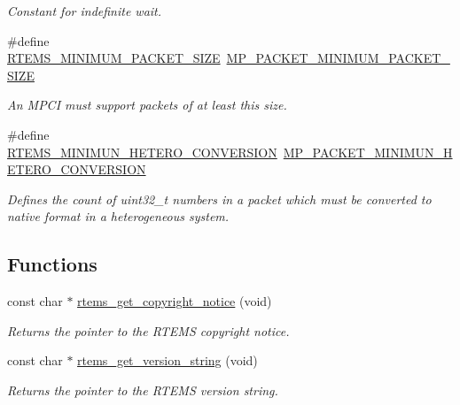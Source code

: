 \begin{DoxyCompactItemize}
\begin{DoxyCompactList}\small\item\em Constant for indefinite wait. \end{DoxyCompactList}\item 
\mbox{\label{group__RTEMSAPIClassic_ga29a700d690aee95d785836f54ff4550a}} 
\#define \mbox{\hyperlink{group__RTEMSAPIClassic_ga29a700d690aee95d785836f54ff4550a}{R\+T\+E\+M\+S\+\_\+\+M\+I\+N\+I\+M\+U\+M\+\_\+\+P\+A\+C\+K\+E\+T\+\_\+\+S\+I\+ZE}}~\mbox{\hyperlink{group__RTEMSScoreMPPacket_gadb26ef7629e08a46b4d1caa3a61a6788}{M\+P\+\_\+\+P\+A\+C\+K\+E\+T\+\_\+\+M\+I\+N\+I\+M\+U\+M\+\_\+\+P\+A\+C\+K\+E\+T\+\_\+\+S\+I\+ZE}}
\begin{DoxyCompactList}\small\item\em An M\+P\+CI must support packets of at least this size. \end{DoxyCompactList}\item 
\#define \mbox{\hyperlink{group__RTEMSAPIClassic_ga9c3131af02cd6bf59c91d77b23e0e418}{R\+T\+E\+M\+S\+\_\+\+M\+I\+N\+I\+M\+U\+N\+\_\+\+H\+E\+T\+E\+R\+O\+\_\+\+C\+O\+N\+V\+E\+R\+S\+I\+ON}}~\mbox{\hyperlink{group__RTEMSScoreMPPacket_ga100bacab2178ec9d2d157920a10a9d4f}{M\+P\+\_\+\+P\+A\+C\+K\+E\+T\+\_\+\+M\+I\+N\+I\+M\+U\+N\+\_\+\+H\+E\+T\+E\+R\+O\+\_\+\+C\+O\+N\+V\+E\+R\+S\+I\+ON}}
\begin{DoxyCompactList}\small\item\em Defines the count of {\ttfamily uint32\+\_\+t} numbers in a packet which must be converted to native format in a heterogeneous system. \end{DoxyCompactList}\end{DoxyCompactItemize}
\subsection*{Functions}
\begin{DoxyCompactItemize}
\item 
\mbox{\label{group__RTEMSAPIClassic_ga0d908223c4c681f71809858fc266af26}} 
const char $\ast$ \mbox{\hyperlink{group__RTEMSAPIClassic_ga0d908223c4c681f71809858fc266af26}{rtems\+\_\+get\+\_\+copyright\+\_\+notice}} (void)
\begin{DoxyCompactList}\small\item\em Returns the pointer to the R\+T\+E\+MS copyright notice. \end{DoxyCompactList}\item 
\mbox{\label{group__RTEMSAPIClassic_ga18bc1884a789b876f88fce8a5d292bd0}} 
const char $\ast$ \mbox{\hyperlink{group__RTEMSAPIClassic_ga18bc1884a789b876f88fce8a5d292bd0}{rtems\+\_\+get\+\_\+version\+\_\+string}} (void)
\begin{DoxyCompactList}\small\item\em Returns the pointer to the R\+T\+E\+MS version string. \end{DoxyCompactList}\end{DoxyCompactItemize}


